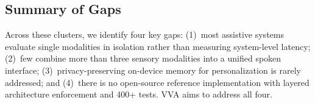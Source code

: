 \subsection{Summary of Gaps}

Across these clusters, we identify four key gaps: (1)~most assistive systems evaluate single modalities in isolation rather than measuring system-level latency; (2)~few combine more than three sensory modalities into a unified spoken interface; (3)~privacy-preserving on-device memory for personalization is rarely addressed; and (4)~there is no open-source reference implementation with layered architecture enforcement and 400+ tests. VVA aims to address all four.

